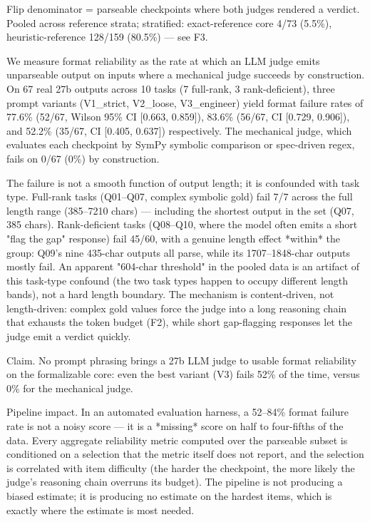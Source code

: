 \documentclass[10pt,twocolumn]{article}
\begin{document}
Flip denominator = parseable checkpoints where both judges rendered a verdict. Pooled across reference strata; stratified: exact-reference core 4/73 (5.5\%), heuristic-reference 128/159 (80.5\%) — see F3.


We measure format reliability as the rate at which an LLM judge emits unparseable output on inputs where a mechanical judge succeeds by construction. On 67 real 27b outputs across 10 tasks (7 full-rank, 3 rank-deficient), three prompt variants (V1\_strict, V2\_loose, V3\_engineer) yield format failure rates of 77.6\% (52/67, Wilson 95\% CI [0.663, 0.859]), 83.6\% (56/67, CI [0.729, 0.906]), and 52.2\% (35/67, CI [0.405, 0.637]) respectively. The mechanical judge, which evaluates each checkpoint by SymPy symbolic comparison or spec-driven regex, fails on 0/67 (0\%) by construction.


The failure is not a smooth function of output length; it is confounded with task type. Full-rank tasks (Q01–Q07, complex symbolic gold) fail 7/7 across the full length range (385–7210 chars) — including the shortest output in the set (Q07, 385 chars). Rank-deficient tasks (Q08–Q10, where the model often emits a short "flag the gap" response) fail 45/60, with a genuine length effect *within* the group: Q09's nine 435-char outputs all parse, while its 1707–1848-char outputs mostly fail. An apparent "604-char threshold" in the pooled data is an artifact of this task-type confound (the two task types happen to occupy different length bands), not a hard length boundary. The mechanism is content-driven, not length-driven: complex gold values force the judge into a long reasoning chain that exhausts the token budget (F2), while short gap-flagging responses let the judge emit a verdict quickly.


Claim. No prompt phrasing brings a 27b LLM judge to usable format reliability on the formalizable core: even the best variant (V3) fails 52\% of the time, versus 0\% for the mechanical judge.


Pipeline impact. In an automated evaluation harness, a 52–84\% format failure rate is not a noisy score — it is a *missing* score on half to four-fifths of the data. Every aggregate reliability metric computed over the parseable subset is conditioned on a selection that the metric itself does not report, and the selection is correlated with item difficulty (the harder the checkpoint, the more likely the judge's reasoning chain overruns its budget). The pipeline is not producing a biased estimate; it is producing no estimate on the hardest items, which is exactly where the estimate is most needed.
\end{document}
